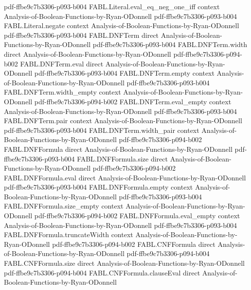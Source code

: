 \begin{theorem}
  {pdf-ffbe9c7b3306-p093-b004}
\proofstep
  {FABL.Literal.eval_eq_neg_one_iff}
  {context}
  {Analysis-of-Boolean-Functions-by-Ryan-ODonnell}
  {pdf-ffbe9c7b3306-p093-b004}
\proofstep
  {FABL.Literal.negate}
  {context}
  {Analysis-of-Boolean-Functions-by-Ryan-ODonnell}
  {pdf-ffbe9c7b3306-p093-b004}
\proofstep
  {FABL.DNFTerm}
  {direct}
  {Analysis-of-Boolean-Functions-by-Ryan-ODonnell}
  {pdf-ffbe9c7b3306-p093-b004}
\proofstep
  {FABL.DNFTerm.width}
  {direct}
  {Analysis-of-Boolean-Functions-by-Ryan-ODonnell}
  {pdf-ffbe9c7b3306-p094-b002}
\proofstep
  {FABL.DNFTerm.eval}
  {direct}
  {Analysis-of-Boolean-Functions-by-Ryan-ODonnell}
  {pdf-ffbe9c7b3306-p093-b004}
\proofstep
  {FABL.DNFTerm.empty}
  {context}
  {Analysis-of-Boolean-Functions-by-Ryan-ODonnell}
  {pdf-ffbe9c7b3306-p093-b004}
\proofstep
  {FABL.DNFTerm.width_empty}
  {context}
  {Analysis-of-Boolean-Functions-by-Ryan-ODonnell}
  {pdf-ffbe9c7b3306-p094-b002}
\proofstep
  {FABL.DNFTerm.eval_empty}
  {context}
  {Analysis-of-Boolean-Functions-by-Ryan-ODonnell}
  {pdf-ffbe9c7b3306-p093-b004}
\proofstep
  {FABL.DNFTerm.pair}
  {context}
  {Analysis-of-Boolean-Functions-by-Ryan-ODonnell}
  {pdf-ffbe9c7b3306-p093-b004}
\proofstep
  {FABL.DNFTerm.width_pair}
  {context}
  {Analysis-of-Boolean-Functions-by-Ryan-ODonnell}
  {pdf-ffbe9c7b3306-p094-b002}
\proofstep
  {FABL.DNFFormula}
  {direct}
  {Analysis-of-Boolean-Functions-by-Ryan-ODonnell}
  {pdf-ffbe9c7b3306-p093-b004}
\proofstep
  {FABL.DNFFormula.size}
  {direct}
  {Analysis-of-Boolean-Functions-by-Ryan-ODonnell}
  {pdf-ffbe9c7b3306-p094-b002}
\proofstep
  {FABL.DNFFormula.eval}
  {direct}
  {Analysis-of-Boolean-Functions-by-Ryan-ODonnell}
  {pdf-ffbe9c7b3306-p093-b004}
\proofstep
  {FABL.DNFFormula.empty}
  {context}
  {Analysis-of-Boolean-Functions-by-Ryan-ODonnell}
  {pdf-ffbe9c7b3306-p093-b004}
\proofstep
  {FABL.DNFFormula.size_empty}
  {context}
  {Analysis-of-Boolean-Functions-by-Ryan-ODonnell}
  {pdf-ffbe9c7b3306-p094-b002}
\proofstep
  {FABL.DNFFormula.eval_empty}
  {context}
  {Analysis-of-Boolean-Functions-by-Ryan-ODonnell}
  {pdf-ffbe9c7b3306-p093-b004}
\proofstep
  {FABL.DNFFormula.truncateWidth}
  {context}
  {Analysis-of-Boolean-Functions-by-Ryan-ODonnell}
  {pdf-ffbe9c7b3306-p094-b002}
\proofstep
  {FABL.CNFFormula}
  {direct}
  {Analysis-of-Boolean-Functions-by-Ryan-ODonnell}
  {pdf-ffbe9c7b3306-p094-b004}
\proofstep
  {FABL.CNFFormula.size}
  {direct}
  {Analysis-of-Boolean-Functions-by-Ryan-ODonnell}
  {pdf-ffbe9c7b3306-p094-b004}
\proofstep
  {FABL.CNFFormula.clauseEval}
  {direct}
  {Analysis-of-Boolean-Functions-by-Ryan-ODonnell}

\end{theorem}
